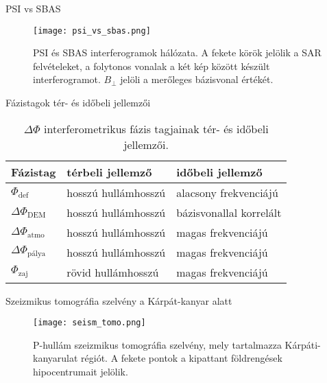 \documentclass[14pt, aspectratio=169]{beamer}
\begin{document}
\begin{frame}{PSI vs SBAS}
    \begin{figure}
        \centering
        \texttt{[image: psi\_vs\_sbas.png]}
        \caption{PSI és SBAS interferogramok hálózata. A fekete körök jelölik a SAR felvételeket, a folytonos vonalak a két kép között készült interferogramot. $B_{\perp}$ jelöli a merőleges bázisvonal értékét.}
    \end{figure}
\end{frame}


\begin{frame}{Fázistagok tér- és időbeli jellemzői}
    \begin{table}[H]
        \centering
        \begin{tabular}{l l l} \toprule
            Fázistag & térbeli jellemző & időbeli jellemző\\ \midrule
            $\Phi_{\text{def}}$ & hosszú hullámhosszú & alacsony frekvenciájú\\
            $\Delta\Phi_{\text{DEM}}$ & hosszú hullámhosszú & bázisvonallal korrelált \\
            $\Delta\Phi_{\text{atmo}}$ & hosszú hullámhosszú & magas frekvenciájú\\
            $\Delta\Phi_{\text{pálya}}$ & hosszú hullámhosszú & magas frekvenciájú \\
            $\Phi_{\text{zaj}}$ & rövid hullámhosszú & magas frekvenciájú \\ \bottomrule
        \end{tabular}
        \caption{$\Delta\Phi$ interferometrikus fázis tagjainak tér- és időbeli jellemzői.}
    \end{table}
\end{frame}


\begin{frame}{Szeizmikus tomográfia szelvény a Kárpát-kanyar alatt}
    \begin{figure}
        \centering
        \texttt{[image: seism\_tomo.png]}
        \caption{P-hullám szeizmikus tomográfia szelvény, mely tartalmazza Kárpáti-kanyarulat régiót. A fekete pontok a kipattant földrengések hipocentrumait jelölik.}
    \end{figure}
\end{frame}
\end{document}
